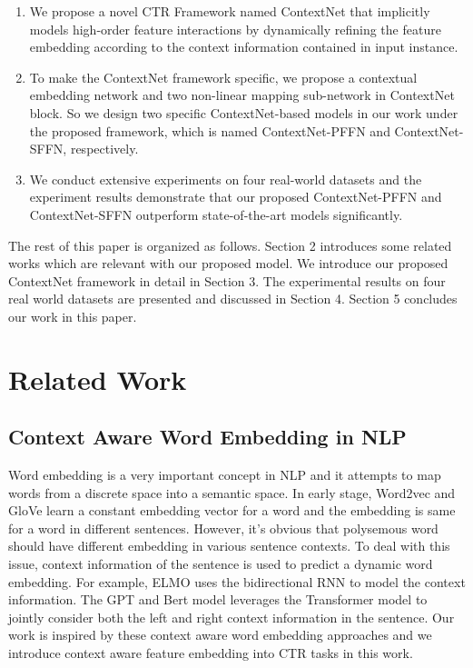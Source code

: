 \documentclass[sigconf]{acmart}
\begin{document}
\begin{enumerate}
  \item We propose a novel CTR Framework named ContextNet that implicitly models high-order feature interactions by dynamically refining the feature embedding according to the context information contained in input instance.

  \item To make the ContextNet framework specific, we propose a contextual embedding network and two non-linear mapping sub-network in ContextNet block. So we design two specific ContextNet-based models in our work under the proposed framework, which is named ContextNet-PFFN and ContextNet-SFFN, respectively.

  \item We conduct extensive experiments on four real-world datasets and the experiment results demonstrate that our proposed ContextNet-PFFN and ContextNet-SFFN outperform state-of-the-art models significantly.
\end{enumerate}

The rest of this paper is organized as follows. Section 2 introduces some related works which are relevant with our proposed model. We introduce our proposed ContextNet framework in detail in Section 3. The experimental results on four real world datasets are presented and discussed in Section 4. Section 5 concludes our work in this paper.



\section{Related Work}
\subsection{Context Aware Word Embedding in NLP}
Word embedding is a very important concept in NLP and it attempts to map words from a discrete space into a semantic space. In early stage, Word2vec\cite{mikolov2013efficient} and GloVe\cite{pennington2014glove} learn a constant embedding vector for a word and the embedding is  same for a word in different sentences.  However, it's obvious that polysemous word should have different embedding in various sentence contexts. To deal with this issue, context information of the sentence is used to predict a dynamic word embedding. For example, ELMO\cite{peters2018deep} uses the bidirectional RNN to model the context information. The GPT\cite{radford2018improving} and Bert\cite{devlin2018bert} model leverages the Transformer\cite{vaswani2017attention} model to jointly consider both the left and right context information in the sentence. Our work is inspired by these context aware word embedding approaches and we introduce context aware feature embedding into CTR tasks in this work.
\end{document}
